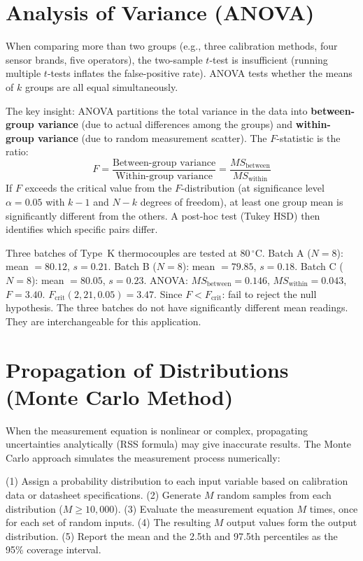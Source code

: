 \documentclass[11pt,letterpaper,twoside,openany]{book}
\newcommand{\degC}{\ensuremath{{}^{\circ}\text{C}}}
\begin{document}
\section{Analysis of Variance (ANOVA)}
When comparing more than two groups (e.g., three calibration methods, four sensor brands, five operators), the two-sample $t$-test is insufficient (running multiple $t$-tests inflates the false-positive rate). ANOVA tests whether the means of $k$ groups are all equal simultaneously.

The key insight: ANOVA partitions the total variance in the data into \textbf{between-group variance} (due to actual differences among the groups) and \textbf{within-group variance} (due to random measurement scatter). The $F$-statistic is the ratio:
\begin{equation}
F = \frac{\text{Between-group variance}}{\text{Within-group variance}} = \frac{MS_{\text{between}}}{MS_{\text{within}}}
\end{equation}
If $F$ exceeds the critical value from the $F$-distribution (at significance level $\alpha = 0.05$ with $k-1$ and $N-k$ degrees of freedom), at least one group mean is significantly different from the others. A post-hoc test (Tukey HSD) then identifies which specific pairs differ.

\begin{examplebox}
Three batches of Type~K thermocouples are tested at 80\,\degC{}. Batch A ($N=8$): mean $= 80.12$, $s = 0.21$. Batch B ($N=8$): mean $= 79.85$, $s = 0.18$. Batch C ($N=8$): mean $= 80.05$, $s = 0.23$. ANOVA: $MS_{\text{between}} = 0.146$, $MS_{\text{within}} = 0.043$, $F = 3.40$. $F_{\text{crit}}(2, 21, 0.05) = 3.47$. Since $F < F_{\text{crit}}$: fail to reject the null hypothesis. The three batches do not have significantly different mean readings. They are interchangeable for this application.
\end{examplebox}

\section{Propagation of Distributions (Monte Carlo Method)}
When the measurement equation is nonlinear or complex, propagating uncertainties analytically (RSS formula) may give inaccurate results. The Monte Carlo approach simulates the measurement process numerically:

(1) Assign a probability distribution to each input variable based on calibration data or datasheet specifications. (2) Generate $M$ random samples from each distribution ($M \geq 10{,}000$). (3) Evaluate the measurement equation $M$ times, once for each set of random inputs. (4) The resulting $M$ output values form the output distribution. (5) Report the mean and the 2.5th and 97.5th percentiles as the 95\% coverage interval.
\end{document}
